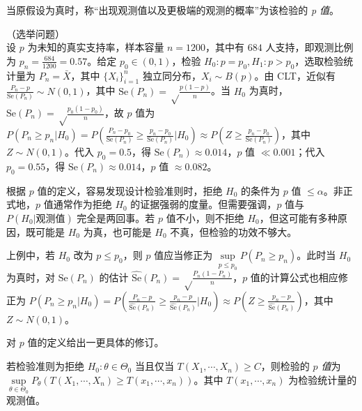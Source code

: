 \documentclass[../main.tex]{subfiles}
\begin{document}
\begin{definition}\label{def:7.4.1}
    当原假设为真时，称“出现观测值以及更极端的观测的概率”为该检验的 \emph{p 值}。
\end{definition}

\begin{example}
    （选举问题）\\
    设 $p$ 为未知的真实支持率，样本容量 $n=1200$，其中有 $684$ 人支持，即观测比例为 $p_n=\frac{684}{1200}=0.57$。给定 $p_0\in(0,1)$，检验 $H_0:p=p_0,H_1:p>p_0$，选取检验统计量为 $P_n=\bar X$，其中 $\{X_i\}_{i=1}^n$ 独立同分布，$X_i\sim B(p)$。由 CLT，近似有 $\frac{P_n-p}{\mathrm{Se}(P_n)}\sim N(0,1)$，其中 $\mathrm{Se}(P_n)=\sqrt\frac{p(1-p)}n$。当 $H_0$ 为真时，$\mathrm{Se}(P_n)=\sqrt\frac{p_0(1-p_0)}n$，故 $p$ 值为 $P(P_n\geq p_n|H_0)=P(\frac{P_n-p_0}{\mathrm{Se}(P_n)}\geq\frac{p_n-p_0}{\mathrm{Se}(P_n)}|H_0)\approx P(Z\geq\frac{p_n-p_0}{\mathrm{Se}(P_n)})$，其中 $Z\sim N(0,1)$。代入 $p_0=0.5$，得 $\mathrm{Se}(P_n)\approx0.014$，$p$ 值 $\ll0.001$；代入 $p_0=0.55$，得 $\mathrm{Se}(P_n)\approx0.014$，$p$ 值 $\approx0.082$。
\end{example}

根据 $p$ 值的定义，容易发现设计检验准则时，拒绝 $H_0$ 的条件为 $p$ 值 $\leq\alpha$。非正式地，$p$ 值通常作为拒绝 $H_0$ 的证据强弱的度量。但需要强调，$p$ 值与 $P(H_0|\text{观测值})$ 完全是两回事。若 $p$ 值不小，则不拒绝 $H_0$，但这可能有多种原因，既可能是 $H_0$ 为真，也可能是 $H_0$ 不真，但检验的功效不够大。

上例中，若 $H_0$ 改为 $p\leq p_0$，则 $p$ 值应当修正为 $\sup\limits_{p\leq p_0}P(P_n\geq p_n)$。此时当 $H_0$ 为真时，对 $\mathrm{Se}(P_n)$ 的估计 $\widehat{\mathrm{Se}}(P_n)=\sqrt\frac{P_n(1-P_n)}n$，$p$ 值的计算公式也相应修正为 $P(P_n\geq p_n|H_0)=P(\frac{P_n-p}{\widehat{\mathrm{Se}}(P_n)}\geq\frac{p_n-p}{\widehat{\mathrm{Se}}(P_n)}|H_0)\approx P(Z\geq\frac{p_n-p}{\widehat{\mathrm{Se}}(P_n)})$，其中 $Z\sim N(0,1)$。

对 $p$ 值的定义给出一更具体的修订。

\begin{definition}\label{def:7.4.2}
    若检验准则为拒绝 $H_0:\theta\in\Theta_0$ 当且仅当 $T(X_1,\cdots,X_n)\geq C$，则检验的 \emph{$p$ 值}为 $\sup\limits_{\theta\in\Theta_0}P_\theta(T(X_1,\cdots,X_n)\geq T(x_1,\cdots,x_n))$。其中 $T(x_1,\cdots,x_n)$ 为检验统计量的观测值。
\end{definition}
\end{document}
